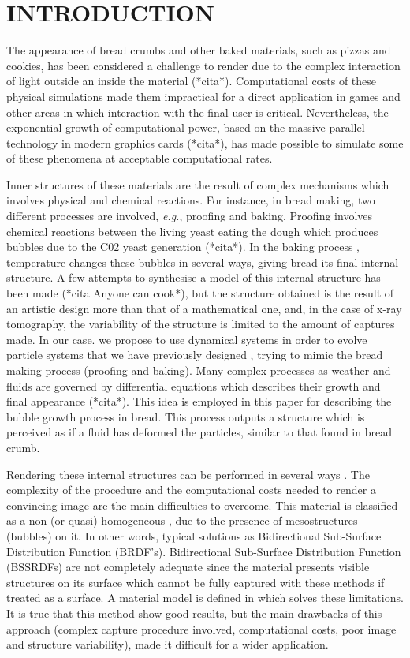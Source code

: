 \documentclass[oneside,a4paper,english,links]{amca}
\begin{document}
\section{INTRODUCTION}

The appearance of bread crumbs and other baked materials, such as pizzas and cookies, has been considered a challenge to render due to the complex interaction of light outside an inside the material (*cita*). Computational costs of these physical simulations made them impractical for a direct application in games and other areas in which interaction with the final user is critical. Nevertheless, the exponential growth of computational power, based on the massive parallel technology in modern graphics cards (*cita*), has made possible to simulate some of these phenomena at acceptable computational rates. 

Inner structures of these materials are the result of complex mechanisms which involves physical and chemical reactions. For instance, in bread making, two different processes are involved, {\em e.g.}, proofing and baking. Proofing involves chemical reactions between the living yeast eating the dough which produces bubbles due to the C02 yeast generation (*cita*). In the baking process \citep{Zhang2006}, temperature changes these bubbles in several ways, giving bread its final internal structure. A few attempts to synthesise a model of this internal structure has been made (*cita Anyone can cook*), but the structure obtained is the result of an artistic design more than that of a mathematical one, and, in the case of x-ray tomography, the variability of the structure is limited to the amount of captures made. In our case. we propose to use dynamical systems \citep{Strogatz2001} in order to evolve particle systems \citep{Reeves83} that we have previously designed \citep{Baravalle2011}, trying to mimic the bread making process (proofing and baking). Many complex processes as weather and fluids are governed by differential equations which describes their growth and final appearance (*cita*). This idea is employed in this paper for describing the bubble growth process in bread. This process outputs a structure which is perceived as if a fluid has deformed the particles, similar to that found in bread crumb.

Rendering these internal structures can be performed in several ways \citep{Tong2005,}. The complexity of the procedure and the computational costs needed to render a convincing image are the main difficulties to overcome. This material is classified as a non (or quasi) homogeneous \citep{Tong2005}, due to the presence of mesostructures (bubbles) on it. In other words, typical solutions as Bidirectional Sub-Surface Distribution Function (BRDF's). Bidirectional Sub-Surface Distribution Function (BSSRDFs) are not completely adequate since the material presents visible structures on its surface which cannot be fully captured with these methods if treated as a surface. A material model is defined in \citep{Tong2005} which solves these limitations. It is true that this method show good results, but the main drawbacks of this approach (complex capture procedure involved, computational costs, poor image and structure variability), made it difficult for a wider application.
\end{document}
